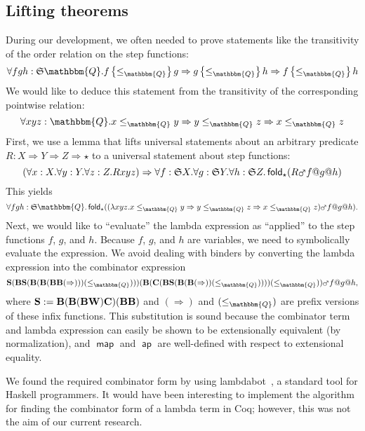 \documentclass{elsarticle}
\makeatletter
\newcommand{\assign}{:=}
\newcommand{\op}[1]{#1}
\newcommand{\tmop}[1]{\ensuremath{\operatorname{#1}}}
\newcommand{\tmstrong}[1]{\textbf{#1}}
\newcommand{\tmtextup}[1]{{\upshape{#1}}}
\newcommand{\Prop}{\ensuremath{\op{\star}}}
\newcommand{\app}{@}
\newcommand{\Map}{\ensuremath{\mars}}
\newcommand{\foldmaptwo}[1]{\ensuremath{\left\{ #1 \right\}}}
\newcommand{\Q}{\ensuremath{\mathbbm{Q}}}
\newcommand{\SF}{\ensuremath{\mathfrak{S}}}
\newcommand{\comp}{\text{{\tmstrong{\tmtextup{B}}}}}
\newcommand{\flip}{\text{{\tmstrong{\tmtextup{C}}}}}
\newcommand{\diag}{\text{{\tmstrong{\tmtextup{W}}}}}
\newcommand{\ess}{\text{{\tmstrong{\tmtextup{S}}}}}
\makeatother
\begin{document}
\subsection{Lifting theorems}\label{ss:liftingTheorems}During our development,
we often needed to prove statements like the transitivity of the order
relation on the step functions:
\[ \forall f g h : \SF \Q . f \foldmaptwo{\leq_{\mathbbm{Q}}} g \Rightarrow g
   \foldmaptwo{\leq_{\mathbbm{Q}}} h \Rightarrow f
   \foldmaptwo{\leq_{\mathbbm{Q}}} h \]
We would like to deduce this statement from the transitivity of the
corresponding pointwise relation:
\[ \forall x y z : \mathbbm{Q}. x \leq_{\mathbbm{Q}} y \Rightarrow y
   \leq_{\mathbbm{Q}} z \Rightarrow x \leq_{\mathbbm{Q}} z \]
First, we use a lemma that lifts universal statements about an arbitrary
predicate $R : X \Rightarrow Y \Rightarrow Z \Rightarrow \Prop$ to a universal
statement about step functions:
\[ (\forall x : X. \forall y : Y. \forall z : Z. R x y z) \Rightarrow \forall
   f : \SF X. \forall g : \SF Y. \forall h : \SF Z.
   \tmop{\mathsf{fold}}_{\Prop} (R \Map f \app g \app h) \]
This yields
\[ \forall f g h : \SF \mathbbm{Q}. \tmop{\mathsf{fold}}_{\Prop} ((\lambda x y
   z. x \leq_{\mathbbm{Q}} y \Rightarrow y \leq_{\mathbbm{Q}} z \Rightarrow x
   \leq_{\mathbbm{Q}} z) \Map f \app g \app h) . \]
Next, we would like to ``evaluate'' the lambda expression as ``applied'' to
the step functions $f$, $g$, and $h$. Because $f$, $g$, and $h$ are variables,
we need to symbolically evaluate the expression. We avoid dealing with binders
by converting the lambda expression into the combinator expression
\[ \ess ( \comp \ess ( \comp ( \comp ( \comp \comp ( \op{\Rightarrow}))) (
   \op{\leq_{\mathbbm{Q}}}))) ( \comp ( \flip ( \comp \ess ( \comp ( \comp (
   \op{\Rightarrow})) ( \op{\leq_{\mathbbm{Q}}})))) (
   \op{\leq_{\mathbbm{Q}}})) \Map f \app g \app h \text{,} \]
where $\ess \assign \comp ( \comp ( \comp \diag) \flip) ( \comp \comp)$ and $(
\op{\Rightarrow})$ and $( \op{\leq_{\mathbbm{Q}}})$ are prefix versions of
these infix functions. This substitution is sound because the combinator term
and lambda expression can easily be shown to be extensionally equivalent (by
normalization), and $\tmop{\mathsf{map}}$ and $\tmop{\mathsf{ap}}$ are
well-defined with respect to extensional equality.

We found the required combinator form by using
lambdabot~{\cite{lambdabot}}, a standard tool for
Haskell programmers. It would have been interesting to implement the algorithm
for finding the combinator form of a lambda term in Coq; however, this was not
the aim of our current research.
\end{document}
